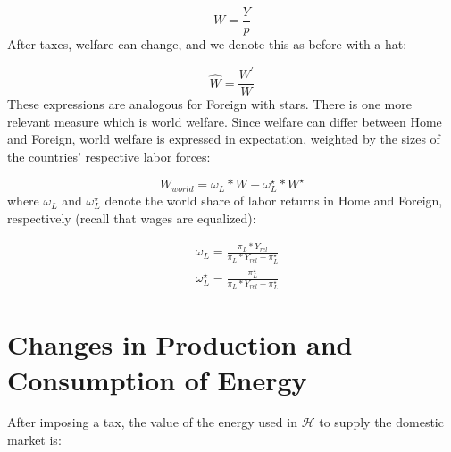 \documentclass[notitlepage,12pt]{article}
\begin{document}
\begin{equation*}
W = \frac{Y}{p}
\end{equation*}
After taxes, welfare can change, and we denote this as before with a hat:

\begin{equation*}
\hat{W} = \frac{W^\prime}{W}
\end{equation*}
These expressions are analogous for Foreign with stars. There is one more relevant measure which is world welfare. Since welfare can differ between Home and Foreign, world welfare is expressed in expectation, weighted by the sizes of the countries' respective labor forces:

\begin{equation}
W_{world} = \omega_L*W + \omega_L^\star*W^\star
\end{equation}
where $\omega_L$ and $\omega_L^\star$ denote the world share of labor returns in Home and Foreign, respectively (recall that wages are equalized):

\begin{align}
&\omega_L = \frac{\pi_L*Y_{rel}}{\pi_L*Y_{rel} + \pi_L^\star}\\
&\omega_L^\star = \frac{\pi_L^\star}{\pi_L*Y_{rel} + \pi_L^\star}
\end{align}

\section{Changes in Production and Consumption of Energy}

After imposing a tax,  the value of the energy used in $\mathcal{H}$
to supply the domestic market is:
\end{document}
